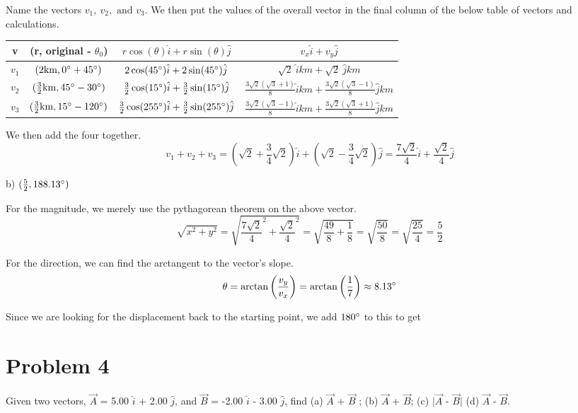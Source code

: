 \documentclass[12pt]{article}
\begin{document}
Name the vectors $v_1,\ v_2, \text{ and } v_3$. We then put the values of the overall vector in the final column of the below table of vectors and calculations.
\begin{center}
    \begin{tabular}{ c | c | c | c }
        v & (r, original - $\theta_0$) & $r\cos(\theta)\hat{i}+r\sin(\theta)\hat{j}$ & $v_x\hat{i} + v_y\hat{j}$\\ \hline
        $v_1$ & $(2\unit{\km},0\degree + 45\degree)$ & $2\cos(45\degree)\hat{i} + 2\sin(45\degree)\hat{j}$ & $\sqrt{2}\ \hat{i}\unit{km} + \sqrt{2}\ \hat{j}\unit{km}$\\
        $v_2$ & $(\frac{3}{2}\unit{\km},45\degree - 30\degree)$ & $\frac{3}{2}\cos(15\degree)\hat{i} + \frac{3}{2}\sin(15\degree)\hat{j}$ & $\frac{3\sqrt{2}(\sqrt{3}+1)}{8}\hat{i}\unit{km} + \frac{3\sqrt{2}(\sqrt{3}-1)}{8}\hat{j}\unit{km}$\\
        $v_3$ & $(\frac{3}{2}\unit{\km},15\degree - 120\degree)$ & \small$\frac{3}{2}\cos(255\degree)\hat{i} + \frac{3}{2}\sin(255\degree)\hat{j}$ & $\frac{3\sqrt{2}(\sqrt{3}-1)}{8}\hat{i}\unit{km} + \frac{3\sqrt{2}(\sqrt{3}+1)}{8}\hat{j}\unit{km}$
    \end{tabular}
\end{center}

We then add the four together.
\[
    v_1 + v_2 + v_3 = (\sqrt{2} + \frac{3}{4}\sqrt{2})\hat{i} + (\sqrt{2} - \frac{3}{4}\sqrt{2})\hat{j} = \boxed{\frac{7\sqrt{2}}{4}\hat{i} + \frac{\sqrt{2}}{4}\hat{j}}
\]

\pagebreak
b) $(\frac{5}{2},188.13\degree)$

For the magnitude, we merely use the pythagorean theorem on the above vector.
\[
    \sqrt{x^2 + y^2} = \sqrt{\frac{7\sqrt{2}}{4}^2 + \frac{\sqrt{2}}{4}^2} 
                    = \sqrt{\frac{49}{8} + \frac{1}{8}} 
                    = \sqrt{\frac{50}{8}} 
                    = \sqrt{\frac{25}{4}} 
                    = \boxed{\frac{5}{2}}
\]

For the direction, we can find the arctangent to the vector's slope.
\begin{equation*}
    \theta = \arctan \left( \frac{v_y}{v_x} \right) = \arctan \left( \frac{1}{7} \right) \approx 8.13\degree
\end{equation*}

Since we are looking for the displacement back to the starting point, we add $180\degree$ to this to get \boxed{188.13\degree}

\pagebreak
\section*{Problem 4}
Given two vectors, $\Vec{A}$ = 5.00 $\hat{i}$ + 2.00 $\hat{j}$, and $\Vec{B}$ = -2.00 $\hat{i}$ - 3.00 $\hat{j}$, find (a) $\Vec{A}$ + $\Vec{B}$ ; (b) $\Vec{A}$ + $\Vec{B}$; (c) $|\Vec{A}$ - $\Vec{B}|$ (d) $\Vec{A}$ - $\Vec{B}$.
\end{document}
